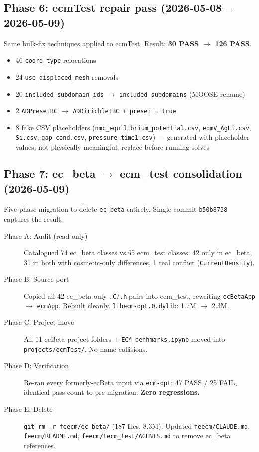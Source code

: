 \documentclass[11pt,letterpaper]{article}
\newenvironment{tightitemize}{\begin{itemize}\setlength\itemsep{0pt}\setlength\parsep{0pt}}{\end{itemize}}
\newcommand{\code}[1]{\texttt{\small #1}}
\begin{document}
\subsection{Phase 6: ecmTest repair pass (2026-05-08 -- 2026-05-09)}

Same bulk-fix techniques applied to ecmTest. Result: \textbf{30 PASS $\to$ 126 PASS}.

\begin{tightitemize}
  \item 46 \code{coord\_type} relocations
  \item 24 \code{use\_displaced\_mesh} removals
  \item 20 \code{included\_subdomain\_ids} $\to$ \code{included\_subdomains} (MOOSE rename)
  \item 2 \code{ADPresetBC} $\to$ \code{ADDirichletBC + preset = true}
  \item 8 fake CSV placeholders (\code{nmc\_equilibrium\_potential.csv}, \code{eqmV\_AgLi.csv}, \code{Si.csv}, \code{gap\_cond.csv}, \code{pressure\_time1.csv}) --- generated with placeholder values; not physically meaningful, replace before running solves
\end{tightitemize}

\subsection{Phase 7: ec\_beta $\to$ ecm\_test consolidation (2026-05-09)}

Five-phase migration to delete \code{ec\_beta} entirely. Single commit
\code{b50b8738} captures the result.

\begin{description}
  \item[Phase A: Audit (read-only)] Catalogued 74 ec\_beta classes vs 65 ecm\_test classes:
    42 only in ec\_beta, 31 in both with cosmetic-only differences, 1 real conflict (\code{CurrentDensity}).
  \item[Phase B: Source port] Copied all 42 ec\_beta-only \code{.C}/\code{.h} pairs into ecm\_test, rewriting \code{ecBetaApp} $\to$ \code{ecmApp}. Rebuilt cleanly. \code{libecm-opt.0.dylib}: 1.7M $\to$ 2.3M.
  \item[Phase C: Project move] All 11 ecBeta project folders + \code{ECM\_benhmarks.ipynb} moved into \code{projects/ecmTest/}. No name collisions.
  \item[Phase D: Verification] Re-ran every formerly-ecBeta input via \code{ecm-opt}: 47 PASS / 25 FAIL, identical pass count to pre-migration. \textbf{Zero regressions.}
  \item[Phase E: Delete] \code{git rm -r feecm/ec\_beta/} (187 files, 8.3M). Updated \code{feecm/CLAUDE.md}, \code{feecm/README.md}, \code{feecm/tecm\_test/AGENTS.md} to remove ec\_beta references.
\end{description}
\end{document}
